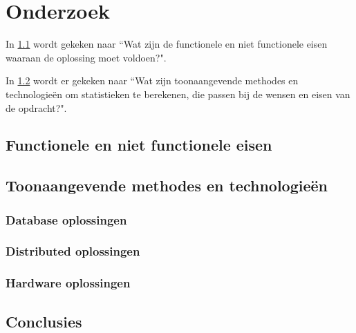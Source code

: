 \chapter{Onderzoek}





In \ref{sec:deelvraag1} wordt gekeken naar ``Wat zijn de functionele en niet functionele eisen waaraan de oplossing moet voldoen?".

In \ref{sec:deelvraag2} wordt er gekeken naar ``Wat zijn toonaangevende methodes en technologieën om statistieken te berekenen, die passen bij de wensen en eisen van de opdracht?".


\clearpage

\section{Functionele en niet functionele eisen}
\label{sec:deelvraag1}


\clearpage

\section{Toonaangevende methodes en technologieën}
\label{sec:deelvraag2}


\newpage

\subsection{Database oplossingen}
\label{sec:databases}

\clearpage

\subsection{Distributed oplossingen}
\label{sec:distributed}

\clearpage

\subsection{Hardware oplossingen}
\label{sec:hardware}

\clearpage

\section{Conclusies}
\label{sec:gevonden_tools}

